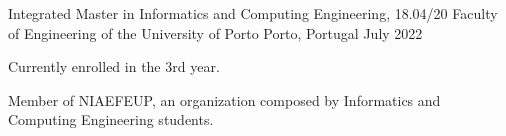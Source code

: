 
\begin{cventries}
  \cventry
    {Integrated Master in Informatics and Computing Engineering, 18.04/20} %
    {Faculty of Engineering of the University of Porto} %
    {Porto, Portugal} %
    {July 2022} %
    {
      \begin{cvitems}
        \item {Currently enrolled in the 3rd year.}
        \item {Member of NIAEFEUP, an organization composed by Informatics and Computing Engineering students.}
      \end{cvitems}
    }
\end{cventries}
